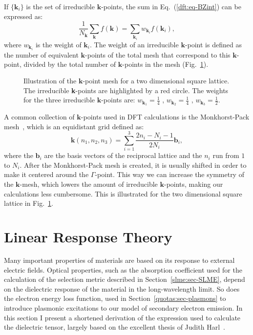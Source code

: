 \begin{refsection}
If $\{\mathbf{k}_i\}$ is the set of irreducible $\mathbf{k}$-points, the sum 
in Eq.~(\ref{dft:eq-BZint}) can be expressed as: 
\begin{equation} 
\frac{1}{N_\mathbf{k}} \sum_\mathbf{k} f(\mathbf{k}) =  \sum_{\mathbf{k}_i} 
w_{\mathbf{k}_i} f(\mathbf{k}_i), 
\end{equation} 
where $w_{\mathbf{k}_i}$ is the weight of $\mathbf{k}_i$. The weight of an 
irreducible $\mathbf{k}$-point is defined as the number of equivalent 
$\mathbf{k}$-points of the total mesh that correspond to this 
$\mathbf{k}$-point, divided by the total number of $\mathbf{k}$-points in the 
mesh (Fig.~\ref{dft:fig-k_mesh}). 
 
\begin{figure}[ht]  
\centering 

\caption{\label{dft:fig-k_mesh}Illustration of the $\mathbf{k}$-point mesh for a 
two dimensional square lattice. The irreducible \textbf{k}-points are 
highlighted by a red circle. The weights for the three irreducible 
$\mathbf{k}$-points are: $w_{\mathbf{k}_1} = \frac{1}{4}$ , $w_{\mathbf{k}_2} 
= \frac{1}{4}$ , $w_{\mathbf{k}_3} = \frac{1}{2}$.} 
\end{figure} 

 \label{dft:sec-monkhorst}
A common collection of $\mathbf{k}$-points used in \gls{DFT} calculations is the 
Monkhorst-Pack mesh~\cite{Monkhorst1976}, which is an equidistant grid defined 
as: 
\begin{equation} 
\mathbf{k}(n_1,n_2,n_3) = \sum_{i=1}^{3} \frac{2n_i - N_i - 1}{2N_i} 
\mathbf{b}_i, 
\end{equation} 
where the $\mathbf{b}_i$ are the basis vectors of the reciprocal lattice and the $n_i$ run 
from $1$ to $N_i$. After the Monkhorst-Pack mesh is created, it is usually 
shifted in order to make it centered around the $\Gamma$-point. This way we 
can increase the symmetry of the $\mathbf{k}$-mesh, which lowers the amount of 
irreducible $\mathbf{k}$-points, making our calculations less cumbersome. This 
is illustrated for the two dimensional square lattice in 
Fig.~\ref{dft:fig-k_mesh}. 
 
\section{Linear Response Theory} \label{dft:sec-linear} 

Many important properties of materials are based on its response to external 
electric fields. Optical properties, such as the absorption coefficient used 
for the calculation of the selection metric described in 
Section~\ref{slme:sec-SLME}, depend on the dielectric response of the material 
in the long-wavelength limit. So does the electron energy loss function, used in 
Section~\ref{quotas:sec-plasmons} to introduce plasmonic excitations to our 
model of secondary electron emission. In this section I present a shortened 
derivation of the expression used to calculate the dielectric tensor, largely 
based on the excellent thesis of Judith Harl~\cite{Harl2008}.


\end{refsection}
